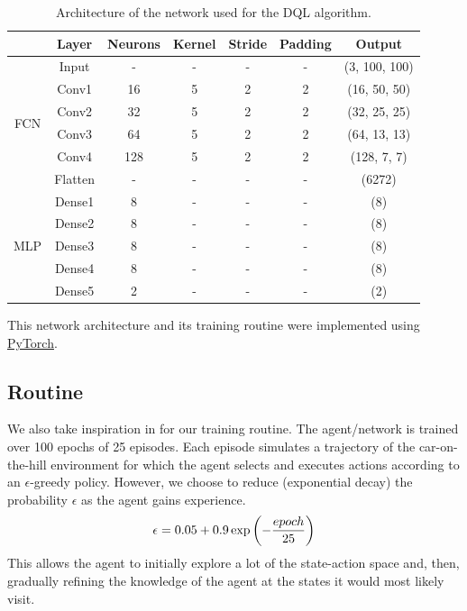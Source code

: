 \documentclass[a4paper, 12pt]{article}
\begin{document}
    \begin{table}[H]
        \centering
	    \begin{tabular}{c|c|c|c|c|c|c}
	        & \textbf{Layer} & \textbf{Neurons} & \textbf{Kernel} & \textbf{Stride} & \textbf{Padding} & \textbf{Output} \\ \hline
	        & Input & - & - & - & - & (3, 100, 100)\\ \hline
	        \multirow{4}{*}{FCN} & Conv1 & 16 & 5 & 2 & 2 & (16, 50, 50) \\ \cline{2-7}
	        & Conv2 & 32 & 5 & 2 & 2 & (32, 25, 25) \\ \cline{2-7}
	        & Conv3 & 64 & 5 & 2 & 2 & (64, 13, 13) \\ \cline{2-7}
	        & Conv4 & 128 & 5 & 2 & 2 & (128, 7, 7) \\ \hline
	        & Flatten & - & - & - & - & (6272) \\ \hline
	        \multirow{5}{*}{MLP} & Dense1 & 8 & - & - & - & (8)\\ \cline{2-7}
	        & Dense2 & 8 & - & - & - & (8) \\ \cline{2-7}
	        & Dense3 & 8 & - & - & - & (8) \\ \cline{2-7}
	        & Dense4 & 8 & - & - & - & (8) \\ \cline{2-7}
	        & Dense5 & 2 & - & - & - & (2)
	    \end{tabular}
	    \caption{Architecture of the network used for the DQL algorithm.}
	    \label{tab.dqn.architecture}
	\end{table}
	
	\begin{note}
        This network architecture and its training routine were implemented using \href{https://pytorch.org}{PyTorch}.
    \end{note}
    
    \subsection{Routine}
    
    We also take inspiration in \textcite{mnih2013playing} for our training routine. The agent/network is trained over 100 epochs of 25 episodes. Each episode simulates a trajectory of the car-on-the-hill environment for which the agent selects and executes actions according to an $\epsilon$-greedy policy. However, we choose to reduce (exponential decay) the probability $\epsilon$ as the agent gains experience.
    \begin{equation}
        \epsilon = \num{0.05} + \num{0.9} \exp{\left(-\frac{epoch}{25}\right)}
    \end{equation}
    This allows the agent to initially explore a lot of the state-action space and, then, gradually refining the knowledge of the agent at the states it would most likely visit.
    
\end{document}
